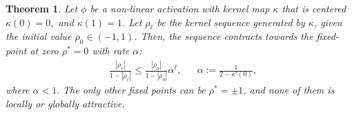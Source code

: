 \documentclass[twoside]{article}
\newtheorem{theorem}{Theorem}
\newtheorem{remark}{Remark}
\theoremstyle{definition}
\newcommand{\thomas}[1]{{\color{blue}TH:  \textit{#1}}}
\begin{document}
\begin{theorem}\label{thm:global_attract_centered}
Let $\phi$ be a non-linear activation with kernel map $\kappa$ that is centered $\kappa(0)=0,$ and $\kappa(1)=1$. 
Let $\rho_\ell$ be the kernel sequence generated by $\kappa$, given the initial value $\rho_0 \in(-1 , 1)$.
Then, the sequence contracts towards the fixed-point at zero $\rho^*=0$ with rate $\alpha$:
    \begin{align}
        &\frac{|\rho_\ell|}{1-|\rho_\ell|} \le \frac{|\rho_0|}{1-|\rho_0|}\alpha^{\ell}, && \alpha := \frac{1}{2-\kappa'(0)},
    \end{align}
 where $\alpha<1.$ The only other fixed points can be $\rho^*=\pm 1$, and none of them is locally or globally attractive.
\end{theorem}


\end{document}
